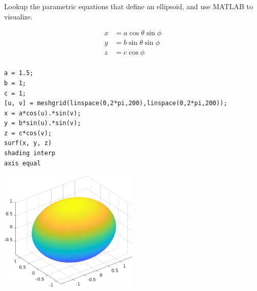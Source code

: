 Lookup the parametric equations that define an ellipsoid, and use MATLAB to visualize.

\begin{solution}
\begin{align*}
    x &= a \cos\theta \sin\phi \\
    y &= b \sin\theta \sin\phi \\
    z &= c \cos\phi \\
\end{align*}

\begin{lstlisting}
a = 1.5;
b = 1;
c = 1;
[u, v] = meshgrid(linspace(0,2*pi,200),linspace(0,2*pi,200));
x = a*cos(u).*sin(v);
y = b*sin(u).*sin(v);
z = c*cos(v);
surf(x, y, z)
shading interp
axis equal
\end{lstlisting}

\begin{center}
    \includegraphics[width=0.5\textwidth]{img/e15p1.png}
\end{center}
\end{solution}